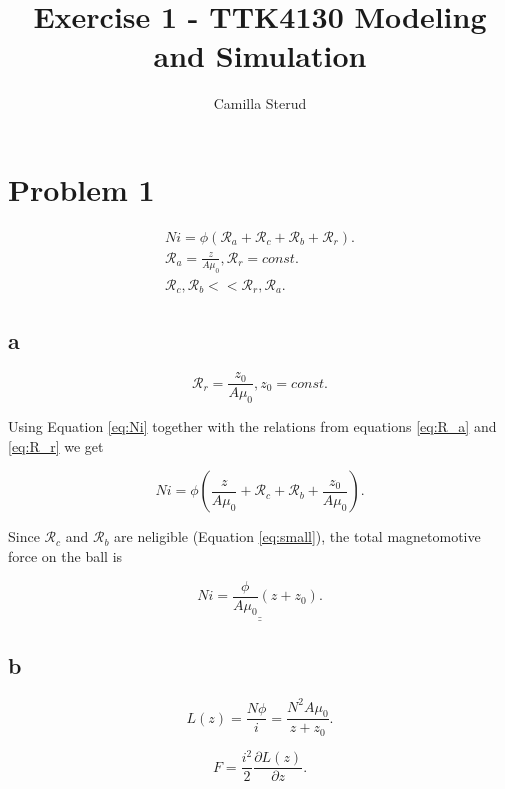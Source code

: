 \documentclass{article}
\title{Exercise 1 - TTK4130 Modeling and Simulation}
\author{Camilla Sterud}
\begin{document}
\maketitle

\newpage

\section{Problem 1}

\begin{align}
	Ni = \phi(\mathcal R_a + \mathcal R_c + \mathcal R_b + \mathcal R_r).\label{eq:Ni}\\ 
	\mathcal R_a = \frac{z}{A\mu_0}, \mathcal R_r = const. \label{eq:R_a} \\ 
	\mathcal R_c, \mathcal R_b << \mathcal R_r, \mathcal R_a. \label{eq:small}
\end{align}


\subsection{a}

\begin{equation}\label{eq:R_r}
	\mathcal R_r = \frac{z_0}{A\mu_0}, z_0 = const.
\end{equation}

Using Equation \ref{eq:Ni} together with the relations from equations \ref{eq:R_a} and \ref{eq:R_r} we get

\begin{equation*}
	Ni = \phi(\frac{z}{A\mu_0} + \mathcal R_c + \mathcal R_b + \frac{z_0}{A\mu_0}).
\end{equation*}

Since $\mathcal R_c$ and $\mathcal R_b$ are neligible (Equation \ref{eq:small}), the total magnetomotive force on the ball is

\begin{equation*}
	\underline{\underline{Ni = \frac{\phi}{A\mu_0}(z + z_0).}}
\end{equation*}

\subsection{b}

\begin{equation} \label{eq:induct}
	L(z) = \frac{N\phi}{i} = \frac{N^2A\mu_0}{z + z_0}.
\end{equation}

\begin{equation}\label{eq:magnF}
	F = \frac{i^2}{2}\frac{\partial L(z)}{\partial z}.
\end{equation}
\end{document}
